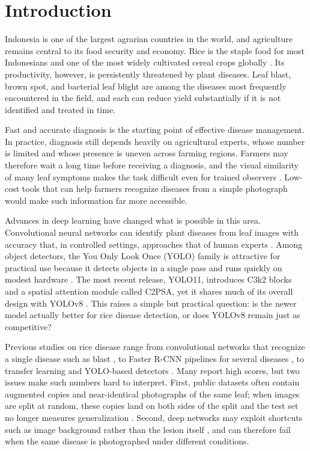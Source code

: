 \documentclass[conference]{IEEEtran}
\begin{document}
\section{Introduction}

Indonesia is one of the largest agrarian countries in the world, and agriculture remains central to its food security and economy. Rice is the staple food for most Indonesians and one of the most widely cultivated cereal crops globally \cite{sethy2020}. Its productivity, however, is persistently threatened by plant diseases. Leaf blast, brown spot, and bacterial leaf blight are among the diseases most frequently encountered in the field, and each can reduce yield substantially if it is not identified and treated in time.

Fast and accurate diagnosis is the starting point of effective disease management. In practice, diagnosis still depends heavily on agricultural experts, whose number is limited and whose presence is uneven across farming regions. Farmers may therefore wait a long time before receiving a diagnosis, and the visual similarity of many leaf symptoms makes the task difficult even for trained observers \cite{ferentinos2018}. Low-cost tools that can help farmers recognize diseases from a simple photograph would make such information far more accessible.

Advances in deep learning have changed what is possible in this area. Convolutional neural networks can identify plant diseases from leaf images with accuracy that, in controlled settings, approaches that of human experts \cite{mohanty2016,ferentinos2018}. Among object detectors, the You Only Look Once (YOLO) family is attractive for practical use because it detects objects in a single pass and runs quickly on modest hardware \cite{redmon2016}. The most recent release, YOLO11, introduces C3k2 blocks and a spatial attention module called C2PSA, yet it shares much of its overall design with YOLOv8 \cite{hidayatullah2025,khanam2024}. This raises a simple but practical question: is the newer model actually better for rice disease detection, or does YOLOv8 remain just as competitive?

Previous studies on rice disease range from convolutional networks that recognize a single disease such as blast \cite{liang2019}, to Faster R-CNN pipelines for several diseases \cite{zhou2019}, to transfer learning and YOLO-based detectors \cite{altabaji2024,yasid2026}. Many report high scores, but two issues make such numbers hard to interpret. First, public datasets often contain augmented copies and near-identical photographs of the same leaf; when images are split at random, these copies land on both sides of the split and the test set no longer measures generalization \cite{barz2020,kapoor2023}. Second, deep networks may exploit shortcuts such as image background rather than the lesion itself \cite{geirhos2020,noyan2022}, and can therefore fail when the same disease is photographed under different conditions.
\end{document}
